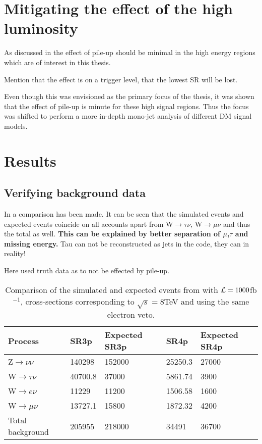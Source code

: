\section{Mitigating the effect of the high luminosity}
As discussed in  the effect of pile-up should be minimal in the high energy regions which are of interest in this thesis. 

Mention that the effect is on a trigger level, that the lowest SR will be lost.

Even though this was envisioned as the primary focus of the thesis, it was shown that the effect of pile-up is minute for these high signal regions. Thus the focus was shifted to perform a more in-depth mono-jet analysis of different DM signal models.
\newpage
\section{Results}\label{chap:sig:sec:res}
\subsection{Verifying background data}\label{Verifying background data}
In  a comparison has been made. It can be seen that the simulated events and expected events coincide on all accounts apart from W$\rightarrow\tau\nu$, W$\rightarrow\mu\nu$ and thus the total as well. \textbf{This can be explained by better separation of $\mu$,$\tau$ and missing energy.} 
Tau can not be reconstructed as jets in the code, they can in reality!

Here used truth data as to not be effected by pile-up.

\begin{table}[ht]
\begin{center}
\begin{tabular}{|l|l|l|l|l|}
\hline
Process & SR3p & Expected SR3p & SR4p & Expected SR4p \\ \hline
Z$\rightarrow\nu\nu$ & 140298 & 152000 & 25250.3 & 27000 \\
W$\rightarrow\tau\nu$ & 40700.8 & 37000 & 5861.74 & 3900 \\
W$\rightarrow e\nu$ & 11229 & 11200 & 1506.58 & 1600 \\
W$\rightarrow\mu\nu$ & 13727.1 & 15800 & 1872.32 & 4200 \\ \hline
Total background & 205955 & 218000 & 34491 & 36700 \\ \hline
\end{tabular}
\caption{Comparison of the simulated and expected events from \citep{ATLAS-CONF-2012-147} with $\mathcal{L}=1000$fb$^{-1}$, cross-sections corresponding to $\sqrt{s}=8$TeV and using the same electron veto.}
\label{tab:Compare1}
\end{center}
\end{table}

